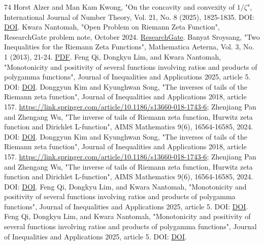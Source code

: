 \begin{thebibliography}{74}
 Horst Alzer and Man Kam Kwong, "On the concavity and convexity of \(1/\zeta\)", International Journal of Number Theory, Vol. 21, No. 8 (2025), 1825-1835. DOI: \href{https://doi.org/10.1142/S1793042125500897}{DOI}.
 Kwara Nantomah, "Open Problem on Riemann Zeta Function", ResearchGate problem note, October 2024. \href{https://www.researchgate.net/publication/384676538_Open_Problem_on_Riemann_Zeta_Function}{ResearchGate}.
 Banyat Sroysang, "Two Inequalities for the Riemann Zeta Functions", Mathematica Aeterna, Vol. 3, No. 1 (2013), 21-24. \href{https://arastirmax.com/en/system/files/dergiler/135290/makaleler/3/1/arastirmax-two-inequalities-riemann-zeta-functions.pdf}{PDF}.
 Feng Qi, Dongkyu Lim, and Kwara Nantomah, "Monotonicity and positivity of several functions involving ratios and products of polygamma functions", Journal of Inequalities and Applications 2025, article 5. DOI: \href{https://doi.org/10.1186/s13660-024-03245-8}{DOI}.
 Donggyun Kim and Kyunghwan Song, "The inverses of tails of the Riemann zeta function", Journal of Inequalities and Applications 2018, article 157. \href{https://link.springer.com/article/10.1186/s13660-018-1743-6}{https://link.springer.com/article/10.1186/s13660-018-1743-6}; Zhenjiang Pan and Zhengang Wu, "The inverse of tails of Riemann zeta function, Hurwitz zeta function and Dirichlet L-function", AIMS Mathematics 9(6), 16564-16585, 2024. DOI: \href{https://doi.org/10.3934/math.2024803}{DOI}.
 Donggyun Kim and Kyunghwan Song, "The inverses of tails of the Riemann zeta function", Journal of Inequalities and Applications 2018, article 157. \href{https://link.springer.com/article/10.1186/s13660-018-1743-6}{https://link.springer.com/article/10.1186/s13660-018-1743-6}; Zhenjiang Pan and Zhengang Wu, "The inverse of tails of Riemann zeta function, Hurwitz zeta function and Dirichlet L-function", AIMS Mathematics 9(6), 16564-16585, 2024. DOI: \href{https://doi.org/10.3934/math.2024803}{DOI}.
 Feng Qi, Dongkyu Lim, and Kwara Nantomah, "Monotonicity and positivity of several functions involving ratios and products of polygamma functions", Journal of Inequalities and Applications 2025, article 5. DOI: \href{https://doi.org/10.1186/s13660-024-03245-8}{DOI}.
 Feng Qi, Dongkyu Lim, and Kwara Nantomah, "Monotonicity and positivity of several functions involving ratios and products of polygamma functions", Journal of Inequalities and Applications 2025, article 5. DOI: \href{https://doi.org/10.1186/s13660-024-03245-8}{DOI}.

\end{thebibliography}
